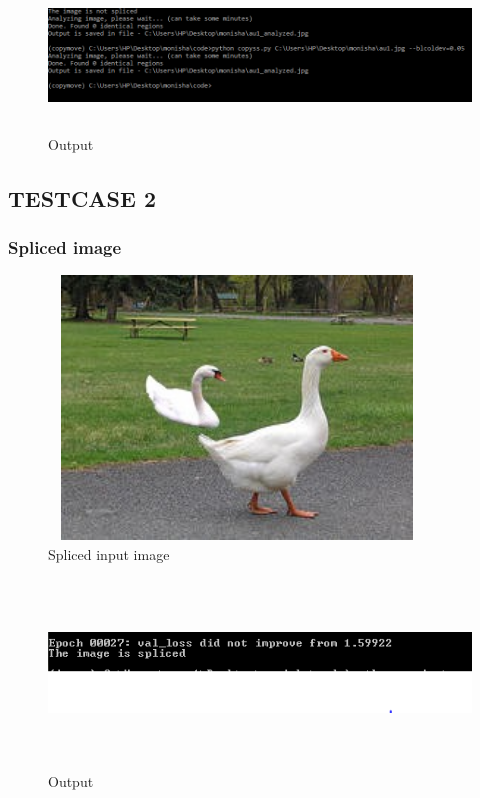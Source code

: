 \begin{figure}[htp]
\centering
\includegraphics[width=15cm,height=4cm]{Figures/auth.PNG}
\caption{Output}
\label{fig:lion}
\end{figure}
\newpage
\subsection{TESTCASE 2}
\subsubsection{Spliced image}

\begin{figure}[htp]
\centering
\includegraphics[width=10cm,height=7cm]{Figures/s1_resaved.jpg}
\caption{Spliced input image}
\label{fig:lion}
\end{figure}
\begin{figure}[htp]
\centering
\includegraphics[width=15cm,height=5cm]{Figures/splicecmd.png}
\caption{Output}
\label{fig:lion}
\end{figure}
\newpage
